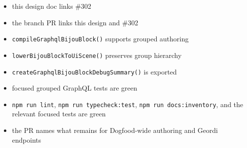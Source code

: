 \begin{itemize}
\tightlist
\item
  this design doc links \#302
\item
  the branch PR links this design and \#302
\item
  \texttt{c\allowbreak{}o\allowbreak{}m\allowbreak{}p\allowbreak{}i\allowbreak{}l\allowbreak{}e\allowbreak{}G\allowbreak{}r\allowbreak{}a\allowbreak{}p\allowbreak{}h\allowbreak{}q\allowbreak{}l\allowbreak{}B\allowbreak{}i\allowbreak{}j\allowbreak{}o\allowbreak{}u\allowbreak{}B\allowbreak{}l\allowbreak{}o\allowbreak{}c\allowbreak{}k\allowbreak{}(\allowbreak{})} supports grouped authoring
\item
  \texttt{l\allowbreak{}o\allowbreak{}w\allowbreak{}e\allowbreak{}r\allowbreak{}B\allowbreak{}i\allowbreak{}j\allowbreak{}o\allowbreak{}u\allowbreak{}B\allowbreak{}l\allowbreak{}o\allowbreak{}c\allowbreak{}k\allowbreak{}T\allowbreak{}o\allowbreak{}U\allowbreak{}i\allowbreak{}S\allowbreak{}c\allowbreak{}e\allowbreak{}n\allowbreak{}e\allowbreak{}(\allowbreak{})} preserves group hierarchy
\item
  \texttt{c\allowbreak{}r\allowbreak{}e\allowbreak{}a\allowbreak{}t\allowbreak{}e\allowbreak{}G\allowbreak{}r\allowbreak{}a\allowbreak{}p\allowbreak{}h\allowbreak{}q\allowbreak{}l\allowbreak{}B\allowbreak{}i\allowbreak{}j\allowbreak{}o\allowbreak{}u\allowbreak{}B\allowbreak{}l\allowbreak{}o\allowbreak{}c\allowbreak{}k\allowbreak{}D\allowbreak{}e\allowbreak{}b\allowbreak{}u\allowbreak{}g\allowbreak{}S\allowbreak{}u\allowbreak{}m\allowbreak{}m\allowbreak{}a\allowbreak{}r\allowbreak{}y\allowbreak{}(\allowbreak{})} is exported
\item
  focused grouped GraphQL tests are green
\item
  \texttt{n\allowbreak{}p\allowbreak{}m\allowbreak{} \allowbreak{}r\allowbreak{}u\allowbreak{}n\allowbreak{} \allowbreak{}l\allowbreak{}i\allowbreak{}n\allowbreak{}t}, \texttt{n\allowbreak{}p\allowbreak{}m\allowbreak{} \allowbreak{}r\allowbreak{}u\allowbreak{}n\allowbreak{} \allowbreak{}t\allowbreak{}y\allowbreak{}p\allowbreak{}e\allowbreak{}c\allowbreak{}h\allowbreak{}e\allowbreak{}c\allowbreak{}k\allowbreak{}:\allowbreak{}t\allowbreak{}e\allowbreak{}s\allowbreak{}t}, \texttt{n\allowbreak{}p\allowbreak{}m\allowbreak{} \allowbreak{}r\allowbreak{}u\allowbreak{}n\allowbreak{} \allowbreak{}d\allowbreak{}o\allowbreak{}c\allowbreak{}s\allowbreak{}:\allowbreak{}i\allowbreak{}n\allowbreak{}v\allowbreak{}e\allowbreak{}n\allowbreak{}t\allowbreak{}o\allowbreak{}r\allowbreak{}y}, and the relevant focused tests are green
\item
  the PR names what remains for Dogfood-wide authoring and Geordi endpoints
\end{itemize}

